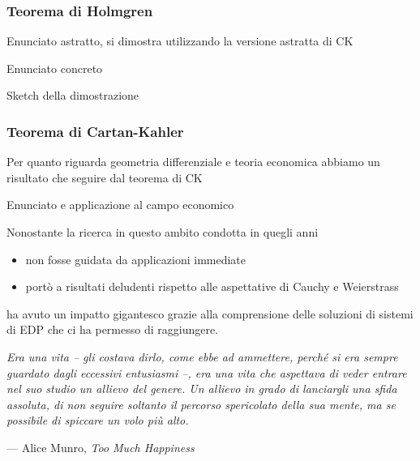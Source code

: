 \documentclass{beamer}
\begin{document}
\begin{frame}
\frametitle{Teorema di Holmgren}
Enunciato astratto, si dimostra utilizzando la versione astratta di CK
\end{frame}


\begin{frame}
Enunciato concreto
\end{frame}

\begin{frame}
Sketch della dimostrazione
\end{frame}

\begin{frame}
\frametitle{Teorema di Cartan-Kahler}
Per quanto riguarda geometria differenziale e teoria economica abbiamo un risultato che seguire dal teorema di CK

Enunciato e applicazione al campo economico
\end{frame}

\begin{frame}
Nonostante la ricerca in questo ambito condotta in quegli anni
\begin{itemize}
\item non fosse guidata da applicazioni immediate
\item portò a risultati deludenti rispetto alle aspettative di Cauchy e Weierstrass
\end{itemize}
ha avuto un impatto gigantesco grazie alla comprensione delle soluzioni di sistemi di EDP che ci ha permesso di raggiungere.
\end{frame}

\begin{frame}

\begin{center}
\textit{
Era una vita -- gli costava dirlo, come ebbe ad ammettere,
perché si era sempre guardato dagli eccessivi entusiasmi --, era una vita
che aspettava di veder entrare nel suo studio un allievo del genere. 
Un allievo in grado di lanciargli una sfida assoluta, 
di non seguire soltanto il percorso spericolato della sua mente, 
ma se possibile di spiccare un volo più alto.
}
\end{center}
\null\hfill --- Alice Munro, \textit{Too Much Happiness}
\end{frame}
\end{document}
